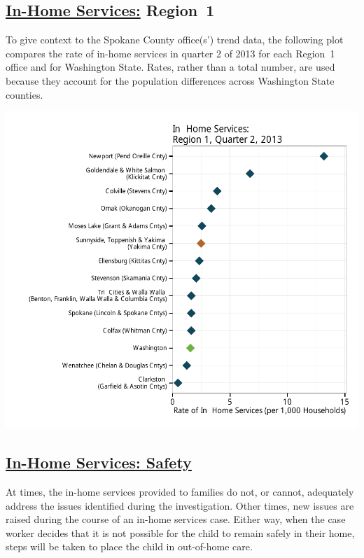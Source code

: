 \documentclass{article}\usepackage[]{graphicx}\usepackage[]{color}
\makeatletter
\def\maxwidth{ %
  \ifdim\Gin@nat@width>\linewidth
    \linewidth
  \else
    \Gin@nat@width
  \fi
}
\newenvironment{knitrout}{}{} %
\makeatother
\begin{document}
\subsection{\href{http://www.partnersforourchildren.org/child-well-being/visualizations/home-services/trends}
    {In-Home Services:} Region~1
}
To give context to the Spokane County office(s') trend data, the following plot compares the rate of in-home services in quarter 2 of 2013 for each Region~1 office and for Washington State. Rates, rather than a total number, are used because they account for the population differences across Washington State counties.
\nopagebreak[3]
\begin{knitrout}
\color{fgcolor}

{\centering \includegraphics[width=\maxwidth]{figure/ihs_context} 

}



\end{knitrout}


\newpage

\subsection{\href{http://www.partnersforourchildren.org/child-well-being/visualizations/home-services/safety}
    {In-Home Services: Safety}
}
At times, the in-home services provided to families do not, or cannot, adequately address the issues identified during the investigation. Other times, new issues are raised during the course of an in-home services case. Either way, when the case worker decides that it is not possible for the child to remain safely in their home, steps will be taken to place the child in out-of-home care.
\end{document}
